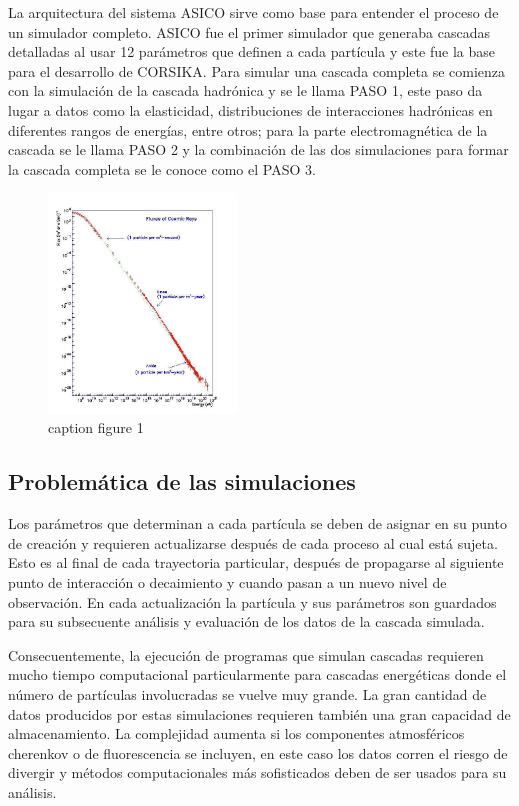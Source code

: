 La arquitectura del sistema ASICO sirve como base para entender el proceso de un simulador completo. ASICO fue el primer simulador que generaba cascadas detalladas al usar 12 parámetros que definen a cada partícula y este fue la base para el desarrollo de CORSIKA.
Para simular una cascada completa se comienza con la simulación de la cascada hadrónica y se le llama PASO 1, este paso da lugar a datos como la elasticidad, distribuciones de interacciones hadrónicas en diferentes rangos de energías, entre otros; para la parte electromagnética de la cascada se le llama PASO 2 y la combinación de las dos simulaciones para formar la cascada completa se le conoce como el PASO 3.

\begin{figure}
    \centering
    \includegraphics[width=50mm,scale=0.5]{Figures/All-particle-cosmic-rays-energy-spectrum.jpg}
    \decoRule
    \caption[asicoarq]{caption figure 1}
    \label{fig:asicoarq}
\end{figure}


\subsection{Problemática de las simulaciones}

Los parámetros que determinan a cada partícula se deben de asignar en su punto de creación y requieren actualizarse después de cada proceso al cual está sujeta. Esto es al final de cada trayectoria particular, después de propagarse al siguiente punto de interacción o decaimiento y cuando pasan a un nuevo nivel de observación. En cada actualización la partícula y sus parámetros son guardados para su subsecuente análisis y evaluación de los datos de la cascada simulada.

Consecuentemente, la ejecución de programas que simulan cascadas requieren mucho tiempo computacional  particularmente para cascadas energéticas donde el número de partículas involucradas se vuelve muy grande. La gran cantidad de datos producidos por estas simulaciones requieren también una gran capacidad de almacenamiento. La complejidad aumenta si los componentes atmosféricos cherenkov o de fluorescencia se incluyen, en este caso los datos corren el riesgo de divergir y métodos computacionales más sofisticados deben de ser usados para su análisis.

